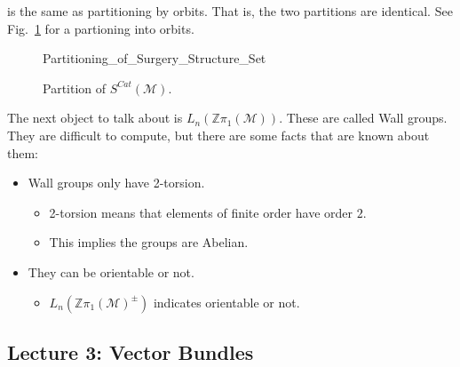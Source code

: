 \documentclass[crop=false,class=book,oneside]{standalone}
\begin{document}
            is the same as partitioning by orbits. That is,
            the two partitions are identical. See
            Fig.~\ref{fig:surgery_theory_partition_of_S_Cat}
            for a partioning into orbits.
            \begin{figure}[H]
                \centering
                \captionsetup{type=figure}
                
                          {Partitioning_of_Surgery_Structure_Set}
                \caption{Partition of $S^{Cat}(\mathcal{M})$.}
                \label{fig:surgery_theory_partition_of_S_Cat}
            \end{figure}
            The next object to talk about is
            $L_{n}(\mathbb{Z}\pi_{1}(\mathcal{M}))$.
            These are called Wall groups.
            They are difficult to compute,
            but there are some facts that are known about them:
            \begin{itemize}
                \item Wall groups only have 2-torsion.
                \begin{itemize}
                    \item 2-torsion means that elements
                          of finite order have order $2$.
                    \item This implies the groups are Abelian.
                \end{itemize}
                \item They can be orientable or not.
                \begin{itemize}
                    \item $L_{n}(%
                           \mathbb{Z}\pi_{1}(\mathcal{M})^{\pm})$
                           indicates orientable or not.
                \end{itemize}
            \end{itemize}
    \subsection{Lecture 3: Vector Bundles}
\end{document}
